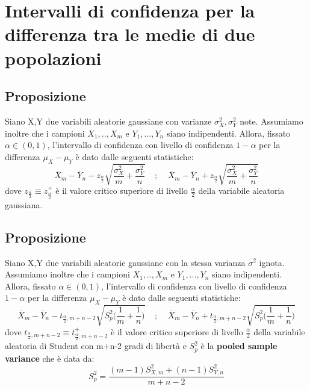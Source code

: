 \documentclass{article}
\begin{document}
\section*{Intervalli di confidenza per la differenza tra le medie di due popolazioni}
\subsection*{Proposizione}
Siano X,Y due variabili aleatorie gaussiane con varianze $\sigma_{X}^{2}, \sigma_{Y}^{2}$ note. Assumiamo inoltre che i campioni $X_{1},..,X_{m}$ e $Y_{1},...,Y_{n}$ siano indipendenti. Allora, fissato $\alpha \in (0,1)$, l'intervallo di confidenza con livello di confidenza $1-\alpha$ per la differenza $\mu_{X}-\mu_{Y}$ è dato dalle seguenti statistiche:
\[ \overline{X}_{m} - \overline{Y}_{n} - z_{\frac{\alpha}{2}}\sqrt{\frac{\sigma_{X}^{2}}{m}+\frac{\sigma_{Y}^{2}}{n}} \; \; \; \; ; \; \; \; \; \overline{X}_{m} - \overline{Y}_{n} + z_{\frac{\alpha}{2}}\sqrt{\frac{\sigma_{X}^{2}}{m}+\frac{\sigma_{Y}^{2}}{n}} \]
dove $z_{\frac{\alpha}{2}} \equiv z_{\frac{\alpha}{2}}^{+}$ è il valore critico superiore di livello $\frac{\alpha}{2}$ della variabile aleatoria gaussiana.

\subsection*{Proposizione}
Siano X,Y due variabili aleatorie gaussiane con la stessa varianza $\sigma^{2}$ ignota. Assumiamo inoltre che i campioni $X_{1},..,X_{m}$ e $Y_{1},...,Y_{n}$ siano indipendenti. Allora, fissato $\alpha \in (0,1)$, l'intervallo di confidenza con livello di confidenza $1-\alpha$ per la differenza $\mu_{X}-\mu_{Y}$ è dato dalle seguenti statistiche:
\[ \overline{X}_{m} - \overline{Y}_{n} - t_{\frac{\alpha}{2},m+n-2}\sqrt{S_{p}^{2} \Big(\frac{1}{m}+\frac{1}{n} \Big)} \; \; \; \; ; \; \; \; \; \overline{X}_{m} - \overline{Y}_{n} + t_{\frac{\alpha}{2},m+n-2}\sqrt{S_{p}^{2} \Big(\frac{1}{m}+\frac{1}{n} \Big)} \]
dove $t_{\frac{\alpha}{2},m+n-2} \equiv t_{\frac{\alpha}{2},m+n-2}^{+}$ è il valore critico superiore di livello $\frac{\alpha}{2}$ della variabile aleatoria di Student con m+n-2 gradi di libertà e $S_{p}^{2}$ è la \textbf{pooled sample variance} che è data da:
\[ S_{p}^{2} = \frac{(m-1)S_{X,m}^{2} + (n-1)S_{Y,n}^{2}}{m+n-2} \]
\end{document}
